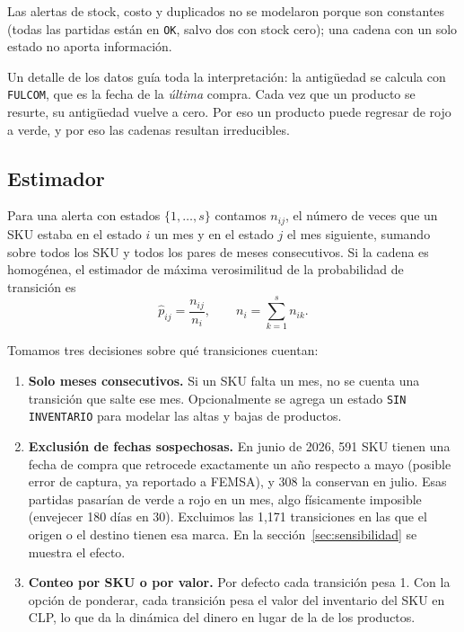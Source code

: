 \documentclass[11pt,letterpaper]{article}
\begin{document}
Las alertas de stock, costo y duplicados no se modelaron porque son constantes (todas las partidas están en \texttt{OK}, salvo dos con stock cero); una cadena con un solo estado no aporta información.

Un detalle de los datos guía toda la interpretación: la antigüedad se calcula con \texttt{FULCOM}, que es la fecha de la \emph{última} compra. Cada vez que un producto se resurte, su antigüedad vuelve a cero. Por eso un producto puede regresar de rojo a verde, y por eso las cadenas resultan irreducibles.

\subsection{Estimador}

Para una alerta con estados $\{1,\dots,s\}$ contamos $n_{ij}$, el número de veces que un SKU estaba en el estado $i$ un mes y en el estado $j$ el mes siguiente, sumando sobre todos los SKU y todos los pares de meses consecutivos. Si la cadena es homogénea, el estimador de máxima verosimilitud de la probabilidad de transición es
\begin{equation}
  \hat p_{ij} = \frac{n_{ij}}{n_i}, \qquad n_i = \sum_{k=1}^{s} n_{ik}.
\end{equation}

Tomamos tres decisiones sobre qué transiciones cuentan:

\begin{enumerate}
  \item \textbf{Solo meses consecutivos.} Si un SKU falta un mes, no se cuenta una transición que salte ese mes. Opcionalmente se agrega un estado \texttt{SIN INVENTARIO} para modelar las altas y bajas de productos.
  \item \textbf{Exclusión de fechas sospechosas.} En junio de 2026, 591 SKU tienen una fecha de compra que retrocede exactamente un año respecto a mayo (posible error de captura, ya reportado a FEMSA), y 308 la conservan en julio. Esas partidas pasarían de verde a rojo en un mes, algo físicamente imposible (envejecer 180 días en 30). Excluimos las 1,171 transiciones en las que el origen o el destino tienen esa marca. En la sección~\ref{sec:sensibilidad} se muestra el efecto.
  \item \textbf{Conteo por SKU o por valor.} Por defecto cada transición pesa 1. Con la opción de ponderar, cada transición pesa el valor del inventario del SKU en CLP, lo que da la dinámica del dinero en lugar de la de los productos.
\end{enumerate}
\end{document}
